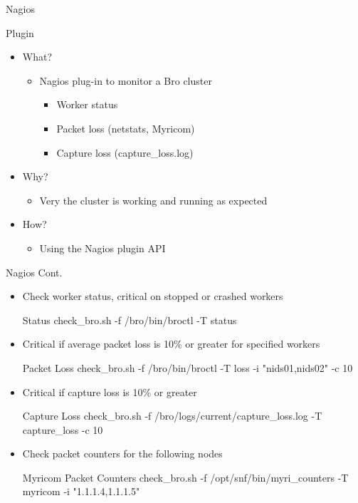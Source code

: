 \documentclass[xcolor=svgnames,handout]{beamer}
\begin{document}
\begin{frame}{Nagios}
  \begin{block}{Plugin}
    \begin{itemize}
      \item What?
    	\begin{itemize}
		\item Nagios plug-in to monitor a Bro cluster
    	        \begin{itemize}
		\item Worker status
                \item Packet loss (netstats, Myricom)
                \item Capture loss (capture\_loss.log)
	        \end{itemize}
	\end{itemize}
	\item Why?
    	\begin{itemize}
		\item Very the cluster is working and running as expected
	\end{itemize}
	\item How?
    	\begin{itemize}
		\item Using the Nagios plugin API
	\end{itemize}
    \end{itemize}
    \end{block}
\end{frame}


\begin{frame}{Nagios Cont.}
  \begin{itemize}
   \item Check worker status, critical on stopped or crashed workers
    \begin{exampleblock}{Status}
      \alert{check\_bro.sh -f /bro/bin/broctl -T status}
    \end{exampleblock}
  \item Critical if average packet loss is 10\% or greater for specified workers
    \begin{exampleblock}{Packet Loss}
      \alert{check\_bro.sh -f /bro/bin/broctl -T loss -i "nids01,nids02" -c 10}
    \end{exampleblock}
   \item Critical if capture loss is 10\% or greater
    \begin{exampleblock}{Capture Loss}
      \alert{check\_bro.sh -f /bro/logs/current/capture\_loss.log -T capture\_loss -c 10}
    \end{exampleblock}
   \item Check packet counters for the following nodes
    \begin{exampleblock}{Myricom Packet Counters}
      \alert{check\_bro.sh -f /opt/snf/bin/myri\_counters -T myricom -i "1.1.1.4,1.1.1.5"}
    \end{exampleblock}
  \end{itemize}
\end{frame}
\end{document}
